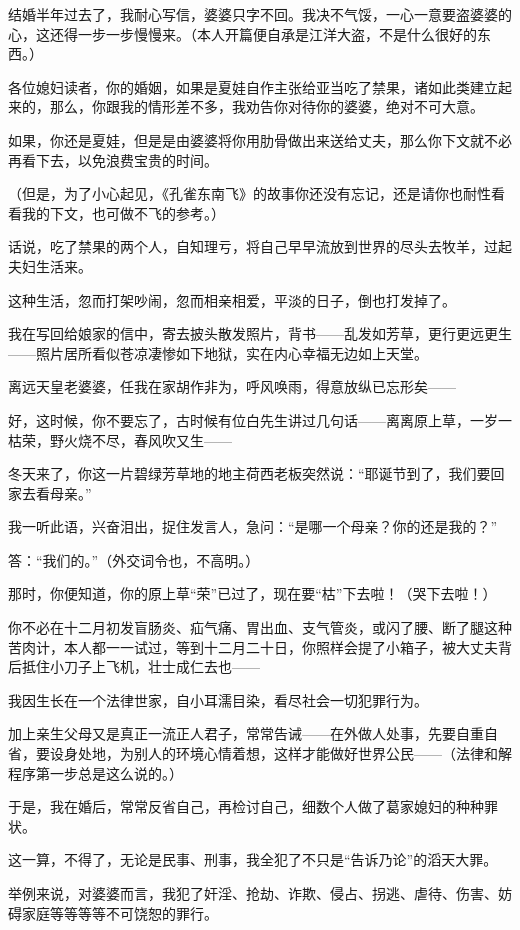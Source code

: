 \par 结婚半年过去了，我耐心写信，婆婆只字不回。我决不气馁，一心一意要盗婆婆的心，这还得一步一步慢慢来。（本人开篇便自承是江洋大盗，不是什么很好的东西。）
\par 各位媳妇读者，你的婚姻，如果是夏娃自作主张给亚当吃了禁果，诸如此类建立起来的，那么，你跟我的情形差不多，我劝告你对待你的婆婆，绝对不可大意。
\par 如果，你还是夏娃，但是是由婆婆将你用肋骨做出来送给丈夫，那么你下文就不必再看下去，以免浪费宝贵的时间。
\par （但是，为了小心起见，《孔雀东南飞》的故事你还没有忘记，还是请你也耐性看看我的下文，也可做不飞的参考。）
\par 话说，吃了禁果的两个人，自知理亏，将自己早早流放到世界的尽头去牧羊，过起夫妇生活来。
\par 这种生活，忽而打架吵闹，忽而相亲相爱，平淡的日子，倒也打发掉了。
\par 我在写回给娘家的信中，寄去披头散发照片，背书——乱发如芳草，更行更远更生——照片居所看似苍凉凄惨如下地狱，实在内心幸福无边如上天堂。
\par 离远天皇老婆婆，任我在家胡作非为，呼风唤雨，得意放纵已忘形矣——
\par 好，这时候，你不要忘了，古时候有位白先生讲过几句话——离离原上草，一岁一枯荣，野火烧不尽，春风吹又生——
\par 冬天来了，你这一片碧绿芳草地的地主荷西老板突然说：“耶诞节到了，我们要回家去看母亲。”
\par 我一听此语，兴奋泪出，捉住发言人，急问：“是哪一个母亲？你的还是我的？”
\par 答：“我们的。”（外交词令也，不高明。）
\par 那时，你便知道，你的原上草“荣”已过了，现在要“枯”下去啦！（哭下去啦！）
\par 你不必在十二月初发盲肠炎、疝气痛、胃出血、支气管炎，或闪了腰、断了腿这种苦肉计，本人都一一试过，等到十二月二十日，你照样会提了小箱子，被大丈夫背后抵住小刀子上飞机，壮士成仁去也——
\par 我因生长在一个法律世家，自小耳濡目染，看尽社会一切犯罪行为。
\par 加上亲生父母又是真正一流正人君子，常常告诫——在外做人处事，先要自重自省，要设身处地，为别人的环境心情着想，这样才能做好世界公民——（法律和解程序第一步总是这么说的。）
\par 于是，我在婚后，常常反省自己，再检讨自己，细数个人做了葛家媳妇的种种罪状。
\par 这一算，不得了，无论是民事、刑事，我全犯了不只是“告诉乃论”的滔天大罪。
\par 举例来说，对婆婆而言，我犯了奸淫、抢劫、诈欺、侵占、拐逃、虐待、伤害、妨碍家庭等等等等不可饶恕的罪行。
